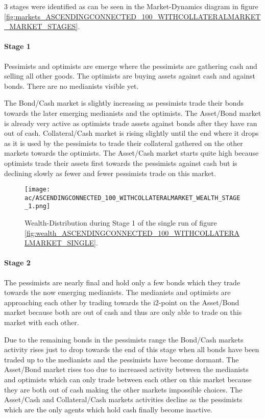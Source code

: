 \documentclass[Bachelorarbeit.tex]{subfiles}
\begin{document}
3 stages were identified as can be seen in the Market-Dynamics diagram in figure \ref{fig:markets_ASCENDINGCONNECTED_100_WITHCOLLATERALMARKET_MARKET_STAGES}.

\paragraph{Stage 1}
Pessimists and optimists are emerge where the pessimists are gathering cash and selling all other goods. The optimists are buying assets against cash and against bonds. There are no medianists visible yet.

\medskip
The Bond/Cash market is slightly increasing as pessimists trade their bonds towards the later emerging medianists and the optimists. The Asset/Bond market is already very active as optimists trade assets against bonds after they have ran out of cash. Collateral/Cash market is rising slightly until the end where it drops as it is used by the pessimists to trade their collateral gathered on the other markets towards the optimists. The Asset/Cash market starts quite high because optimists trade their assets first towards the pessimists against cash but is declining slowly as fewer and fewer pessimists trade on this market.

\begin{figure}[H]
	\centering
  \texttt{[image: ac/ASCENDINGCONNECTED\_100\_WITHCOLLATERALMARKET\_WEALTH\_STAGE\_1.png]}
  	\caption{Wealth-Distribution during Stage 1 of the single run of figure \ref{fig:wealth_ASCENDINGCONNECTED_100_WITHCOLLATERALMARKET_SINGLE}.}
	\label{fig:wealth_ASCENDINGCONNECTED_100_WITHCOLLATERALMARKET_WEALTH_STAGE_1}
\end{figure}

\paragraph{Stage 2}
The pessimists are nearly final and hold only a few bonds which they trade towards the now emerging medianists. The medianists and optimists are approaching each other by trading towards the i2-point on the Asset/Bond market because both are out of cash and thus are only able to trade on this market with each other.

\medskip
Due to the remaining bonds in the pessimists range the Bond/Cash markets activity rises just to drop towards the end of this stage when all bonds have been traded up to the medianists and the pessimists have become dormant. The Asset/Bond market rises too due to increased activity between the medianists and optimists which can only trade between each other on this market because they are both out of cash making the other markets impossible choices. The Asset/Cash and Collateral/Cash markets activities decline as the pessimists which are the only agents which hold cash finally become inactive.
\end{document}
